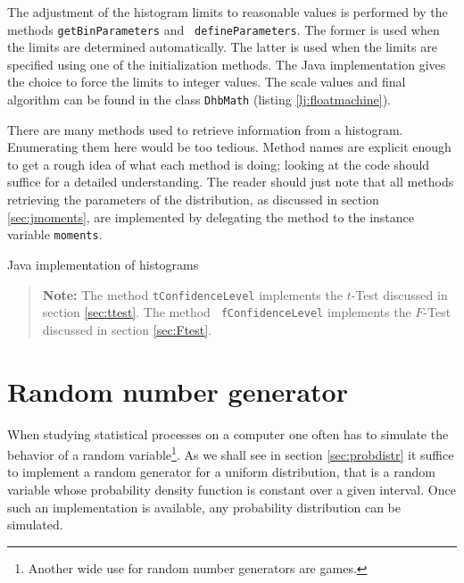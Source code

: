 \documentclass[twoside]{book}
\begin{document}
The adjustment of the histogram limits to reasonable values is
performed by the methods {\tt getBinParameters} and  {\tt
defineParameters}. The former is used when the limits are
determined automatically. The latter is used when the limits are
specified using one of the initialization methods. The Java
implementation gives the choice to force the limits to integer
values. The scale values and final algorithm can be found in the
class {\tt DhbMath} (\cf listing \ref{lj:floatmachine}).

There are many methods used to retrieve information from a
histogram. Enumerating them here would be too tedious. Method
names are explicit enough to get a rough idea of what each method
is doing; looking at the code should suffice for a detailed
understanding. The reader should just note that all methods
retrieving the parameters of the distribution, as discussed in
section \ref{sec:jmoments}, are implemented by delegating the
method to the instance variable {\tt moments}.

\begin{listing} Java implementation of histograms \label{lj:histogram}

\end{listing}
\begin{quote}
{\bf Note:} The method {\tt tConfidenceLevel} implements the
$t$-Test discussed in section \ref{sec:ttest}. The method {\tt
fConfidenceLevel} implements the $F$-Test discussed in section
\ref{sec:Ftest}.
\end{quote}

\section{Random number generator}
\label{sec:random} When studying statistical processes on a
computer one often has to simulate the behavior of a random
variable\footnote{Another wide use for random number generators
are games.}. As we shall see in section \ref{sec:probdistr} it
suffice to implement a random generator for a uniform
distribution, that is a random variable whose probability density
function is constant over a given interval. Once such an
implementation is available, any probability distribution can be
simulated.
\end{document}
